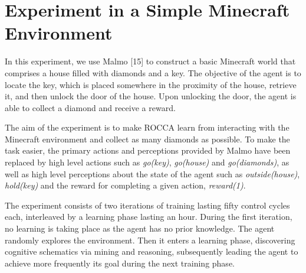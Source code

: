 \documentclass[runningheads]{llncs}
\begin{document}
\section{Experiment in a Simple Minecraft Environment}
\label{sec:minecraft}
In this experiment, we use Malmo [15] to construct a basic Minecraft
world that comprises a house filled with diamonds and a key. The
objective of the agent is to locate the key, which is placed somewhere
in the proximity of the house, retrieve it, and then unlock the door
of the house. Upon unlocking the door, the agent is able to collect a
diamond and receive a reward. \par
The aim of the experiment is to make ROCCA learn from interacting
with the Minecraft environment
and collect as many diamonds as possible.
To make the task easier, the primary actions and perceptions provided
by Malmo have been replaced by high level actions
such as \textit{go(key)}, \textit{go(house)} and
\textit{go(diamonds)}, as well as high level perceptions about the
state of the agent such as \textit{outside(house)}, \textit{hold(key)}
and the reward for completing a given action, \textit{reward(1)}. \par
The experiment consists of two iterations of training lasting fifty
control cycles each, interleaved by a learning phase lasting an
hour. During the first iteration, no learning is taking place as the
agent has no prior knowledge. The agent randomly explores the
environment. Then it enters a learning phase, discovering cognitive
schematics via mining and reasoning, subsequently leading the agent to
achieve more frequently its goal during the next training phase.

\end{document}
